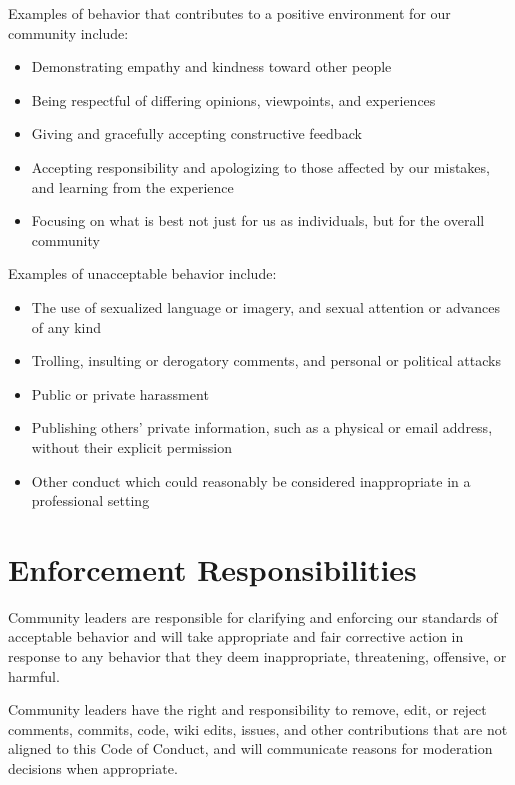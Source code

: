 \documentclass[
  fontsize=13pt,
  english,
  a4paper,
  openany, a4paper, oneside]{book}
\providecommand{\tightlist}{%
  \setlength{\itemsep}{0pt}\setlength{\parskip}{0pt}}
\begin{document}
Examples of behavior that contributes to a positive environment for our
community include:

\begin{itemize}
\tightlist
\item
  Demonstrating empathy and kindness toward other people
\item
  Being respectful of differing opinions, viewpoints, and experiences
\item
  Giving and gracefully accepting constructive feedback
\item
  Accepting responsibility and apologizing to those affected by our mistakes,
  and learning from the experience
\item
  Focusing on what is best not just for us as individuals, but for the
  overall community
\end{itemize}

Examples of unacceptable behavior include:

\begin{itemize}
\tightlist
\item
  The use of sexualized language or imagery, and sexual attention or
  advances of any kind
\item
  Trolling, insulting or derogatory comments, and personal or political attacks
\item
  Public or private harassment
\item
  Publishing others' private information, such as a physical or email
  address, without their explicit permission
\item
  Other conduct which could reasonably be considered inappropriate in a
  professional setting
\end{itemize}

\hypertarget{enforcement-responsibilities}{%
\section{Enforcement Responsibilities}\label{enforcement-responsibilities}}

Community leaders are responsible for clarifying and enforcing our standards of
acceptable behavior and will take appropriate and fair corrective action in
response to any behavior that they deem inappropriate, threatening, offensive,
or harmful.

Community leaders have the right and responsibility to remove, edit, or reject
comments, commits, code, wiki edits, issues, and other contributions that are
not aligned to this Code of Conduct, and will communicate reasons for moderation
decisions when appropriate.
\end{document}

